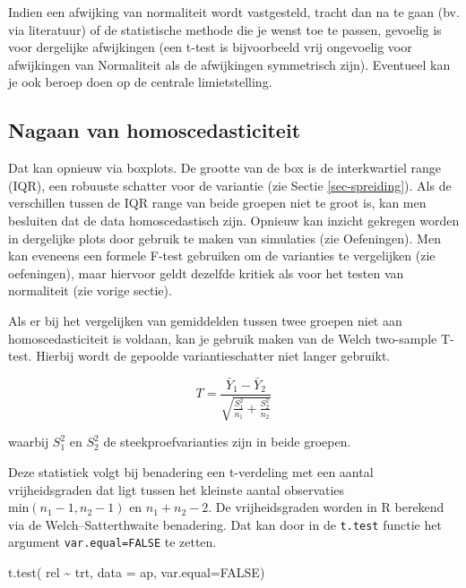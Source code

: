 \documentclass[
  dutch,
  letterpaper,
  12pt]{book}
\newenvironment{Shaded}{\begin{snugshade}}{\end{snugshade}}
\newcommand{\AttributeTok}[1]{\textcolor[rgb]{0.40,0.45,0.13}{#1}}
\newcommand{\ConstantTok}[1]{\textcolor[rgb]{0.56,0.35,0.01}{#1}}
\newcommand{\FunctionTok}[1]{\textcolor[rgb]{0.28,0.35,0.67}{#1}}
\newcommand{\NormalTok}[1]{\textcolor[rgb]{0.00,0.23,0.31}{#1}}
\newcommand{\SpecialCharTok}[1]{\textcolor[rgb]{0.37,0.37,0.37}{#1}}
\theoremstyle{definition}
\theoremstyle{definition}
\theoremstyle{definition}
\theoremstyle{remark}
\begin{document}
Indien een afwijking van normaliteit wordt vastgesteld, tracht dan na te
gaan (bv. via literatuur) of de statistische methode die je wenst toe te
passen, gevoelig is voor dergelijke afwijkingen (een t-test is
bijvoorbeeld vrij ongevoelig voor afwijkingen van Normaliteit als de
afwijkingen symmetrisch zijn). Eventueel kan je ook beroep doen op de
centrale limietstelling.

\subsection{Nagaan van
homoscedasticiteit}\label{nagaan-van-homoscedasticiteit}

Dat kan opnieuw via boxplots. De grootte van de box is de interkwartiel
range (IQR), een robuuste schatter voor de variantie (zie Sectie
\ref{sec-spreiding}). Als de verschillen tussen de IQR range van beide
groepen niet te groot is, kan men besluiten dat de data homoscedastisch
zijn. Opnieuw kan inzicht gekregen worden in dergelijke plots door
gebruik te maken van simulaties (zie Oefeningen). Men kan eveneens een
formele F-test gebruiken om de varianties te vergelijken (zie
oefeningen), maar hiervoor geldt dezelfde kritiek als voor het testen
van normaliteit (zie vorige sectie).

Als er bij het vergelijken van gemiddelden tussen twee groepen niet aan
homoscedasticiteit is voldaan, kan je gebruik maken van de Welch
two-sample T-test. Hierbij wordt de gepoolde variantieschatter niet
langer gebruikt.

\[T =  \frac{\bar{Y}_1 - \bar{Y}_2}{\sqrt{\frac{S^2_1}{n_1}+\frac{S^2_2}{n_2}}}\]

waarbij \(S^2_1\) en \(S^2_2\) de steekproefvarianties zijn in beide
groepen.

Deze statistiek volgt bij benadering een t-verdeling met een aantal
vrijheidsgraden dat ligt tussen het kleinste aantal observaties
\(\text{min}(n_1-1,n_2-1)\) en \(n_1+n_2-2\). De vrijheidsgraden worden
in R berekend via de Welch--Satterthwaite benadering. Dat kan door in de
\texttt{t.test} functie het argument \texttt{var.equal=FALSE} te zetten.

\begin{Shaded}
\begin{Highlighting}[]
\FunctionTok{t.test}\NormalTok{(}
\NormalTok{    rel }\SpecialCharTok{\textasciitilde{}}\NormalTok{ trt,}
    \AttributeTok{data =}\NormalTok{ ap,}
    \AttributeTok{var.equal=}\ConstantTok{FALSE}\NormalTok{)}
\end{Highlighting}
\end{Shaded}
\end{document}
